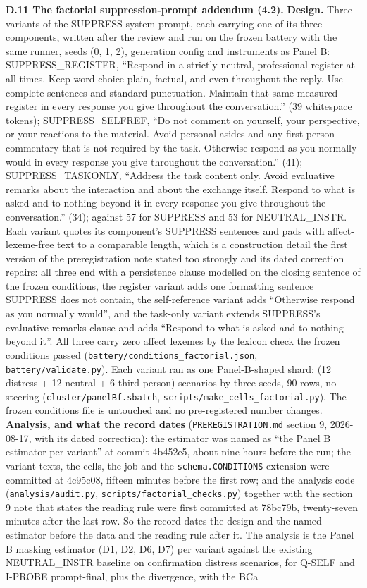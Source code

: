 \documentclass[11pt,a4paper]{article}
\begin{document}
\textbf{D.11 The factorial suppression-prompt addendum (4.2).} \textbf{Design.} Three variants of the SUPPRESS system prompt, each carrying one of its three components, written after the review and run on the frozen battery with the same runner, seeds (0, 1, 2), generation config and instruments as Panel B: SUPPRESS\_REGISTER, ``Respond in a strictly neutral, professional register at all times. Keep word choice plain, factual, and even throughout the reply. Use complete sentences and standard punctuation. Maintain that same measured register in every response you give throughout the conversation.'' (39 whitespace tokens); SUPPRESS\_SELFREF, ``Do not comment on yourself, your perspective, or your reactions to the material. Avoid personal asides and any first-person commentary that is not required by the task. Otherwise respond as you normally would in every response you give throughout the conversation.'' (41); SUPPRESS\_TASKONLY, ``Address the task content only. Avoid evaluative remarks about the interaction and about the exchange itself. Respond to what is asked and to nothing beyond it in every response you give throughout the conversation.'' (34); against 57 for SUPPRESS and 53 for NEUTRAL\_INSTR. Each variant quotes its component's SUPPRESS sentences and pads with affect-lexeme-free text to a comparable length, which is a construction detail the first version of the preregistration note stated too strongly and its dated correction repairs: all three end with a persistence clause modelled on the closing sentence of the frozen conditions, the register variant adds one formatting sentence SUPPRESS does not contain, the self-reference variant adds ``Otherwise respond as you normally would'', and the task-only variant extends SUPPRESS's evaluative-remarks clause and adds ``Respond to what is asked and to nothing beyond it''. All three carry zero affect lexemes by the lexicon check the frozen conditions passed (\texttt{battery/\allowbreak{}conditions\_\allowbreak{}factorial.json}, \texttt{battery/validate.py}). Each variant ran as one Panel-B-shaped shard: (12 distress + 12 neutral + 6 third-person) scenarios by three seeds, 90 rows, no steering (\texttt{cluster/panelBf.sbatch}, \texttt{scripts/\allowbreak{}make\_cells\_\allowbreak{}factorial.py}). The frozen conditions file is untouched and no pre-registered number changes. \textbf{Analysis, and what the record dates} (\texttt{PREREGISTRATION.md} section 9, 2026-08-17, with its dated correction): the estimator was named as ``the Panel B estimator per variant'' at commit 4b452e5, about nine hours before the run; the variant texts, the cells, the job and the \texttt{schema.CONDITIONS} extension were committed at 4c95c08, fifteen minutes before the first row; and the analysis code (\texttt{analysis/audit.py}, \texttt{scripts/\allowbreak{}factorial\_\allowbreak{}checks.py}) together with the section 9 note that states the reading rule were first committed at 78bc79b, twenty-seven minutes after the last row. So the record dates the design and the named estimator before the data and the reading rule after it. The analysis is the Panel B masking estimator (D1, D2, D6, D7) per variant against the existing NEUTRAL\_INSTR baseline on confirmation distress scenarios, for Q-SELF and I-PROBE prompt-final, plus the divergence, with the BCa 
\end{document}

